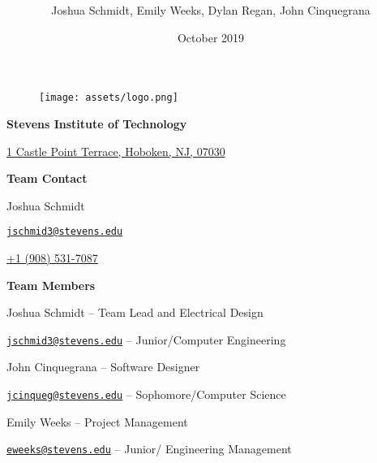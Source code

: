 \documentclass{article}
\title{
  \maintitle \\
	\large \schoolname}
\date{October 2019}
\author{Joshua Schmidt, Emily Weeks, Dylan Regan, John Cinquegrana}
\newcommand{\schoolname}{Stevens Institute of Technology}
\begin{document}
\maketitle

\bigskip
\bigskip
\bigskip
\bigskip

\begin{figure}[!htb]
  \centering
  \texttt{[image: assets/logo.png]}
  \label{fig:logo}
\end{figure}

\newpage

\newcommand{\contactsection}{}



\iffalse

\begin{center}

\bigskip
\bigskip

{

\textbf{\schoolname}

\href{http://maps.google.com/?q=1+Castle+Point+Terrace,+Hoboken,+NJ,+07030}{1 Castle Point Terrace, Hoboken, NJ, 07030}

\bigskip
\bigskip

\textbf{Team Contact}

Joshua Schmidt

\href{mailto:jschmid3@stevens.edu}{\nolinkurl{jschmid3@stevens.edu}}

\href{tel:19085317087}{+1 (908) 531-7087}

\bigskip
\bigskip

\textbf{Team Members}

Joshua Schmidt -- Team Lead and Electrical Design

\href{mailto:jschmid3@stevens.edu}{\nolinkurl{jschmid3@stevens.edu}} -- Junior/Computer Engineering

\bigskip
\bigskip

John Cinquegrana -- Software Designer 

\href{mailto:jcinqueg@stevens.edu}{\nolinkurl{jcinqueg@stevens.edu}} -- Sophomore/Computer Science

\bigskip
\bigskip

Emily Weeks -- Project Management

\href{mailto:eweeks@stevens.edu}{\nolinkurl{eweeks@stevens.edu}} -- Junior/ Engineering Management

\bigskip
\bigskip

}
\end{center}
\end{document}

